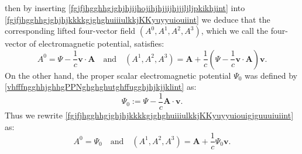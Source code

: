 \documentclass{article}
\theoremstyle{definition}
\theoremstyle{remark}
\renewcommand{\vec}[1]{\mathbf{#1}}
\newcommand{\er}{\eqref}
\newcommand{\er}{\eqref}
\begin{document}
then by inserting
\er{fgjfjhgghhgjghjhjijhojihjhjjijhjjjljljpkikhjint} into
\er{fgjfjhgghhgjghjhjkkkkgjghghuiiiulkkjKKyuyyuiouiint} we deduce
that the corresponding lifted four-vector field $(A^0,A^1,A^2,A^3)$,
which we call the four-vector of electromagnetic potential,
satisfies:
\begin{equation}\label{fgjfjhgghhgjghjhjkkkkgjghghuiiiulkkjKKyuyyuiouigjguuuiuiint}
A^0=\Psi-\frac{1}{c}\vec v\cdot\vec
A\quad\text{and}\quad(A^1,A^2,A^3)=\vec
A+\frac{1}{c}\left(\Psi-\frac{1}{c}\vec v\cdot\vec A\right)\vec v.
\end{equation}
On the other hand, the proper scalar electromagnetic potential
$\Psi_0$ was defined by
\er{vhfffngghhjghhgPPNghghghutghffugghjhjkjjklint} as:
\begin{equation}\label{vhfffngghhjghhgPPNghghghutghffugghjhjkjjklhjghint}
\Psi_0:=\Psi-\frac{1}{c}\vec A\cdot\vec v.
\end{equation}
Thus we rewrite
\er{fgjfjhgghhgjghjhjkkkkgjghghuiiiulkkjKKyuyyuiouigjguuuiuiint} as:
\begin{equation}\label{fgjfjhgghhgjghjhjkkkkgjghghuiiiulkkjKKyuyyuiouigjguuuiui1int}
A^0=\Psi_0\quad\text{and}\quad(A^1,A^2,A^3)=\vec
A+\frac{1}{c}\Psi_0\vec v.
\end{equation}
\end{document}
